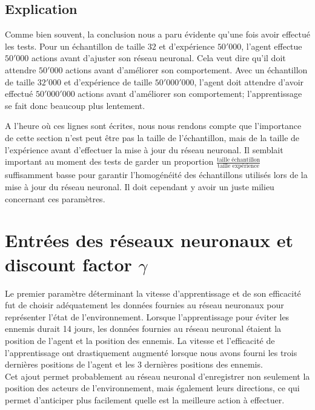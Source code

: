\documentclass[11pt,a4paper]{report}
\begin{document}
   \subsection{Explication}
   
   \par Comme bien souvent, la conclusion nous a paru évidente qu'une fois avoir effectué les tests. Pour un échantillon de taille $32$ et d’expérience $50'000$, l'agent effectue $50'000$ actions avant d'ajuster son réseau neuronal. Cela veut dire qu'il doit attendre $50'000$ actions avant d'améliorer son comportement. Avec un échantillon de taille $32'000$ et d'expérience de taille $50'000'000$, l'agent doit attendre d'avoir effectué $50'000'000$ actions avant d'améliorer son comportement; l'apprentissage se fait donc beaucoup plus lentement. 
   
   \par A l'heure où ces lignes sont écrites, nous nous rendons compte que l'importance de cette section n'est peut être pas la taille de l'échantillon, mais de la taille de l’expérience avant d'effectuer la mise à jour du réseau neuronal. Il semblait important au moment des tests de garder un proportion $\frac{\text{taille échantillon}}{\text{taille expérience}}$ suffisamment basse pour garantir l'homogénéité des échantillons utilisés lors de la mise à jour du réseau neuronal. Il doit cependant y avoir un juste milieu concernant ces paramètres. 
   
   \section{Entrées des réseaux neuronaux et discount factor $\gamma$}
   
   \par Le premier paramètre déterminant la vitesse d'apprentissage et de son efficacité fut de choisir adéquatement les données fournies au réseau neuronaux pour représenter l'état de l'environnement. Lorsque l'apprentissage pour éviter les ennemis durait 14 jours, les données fournies au réseau neuronal étaient la position de l'agent et la position des ennemis. La vitesse et l’efficacité de l'apprentissage ont drastiquement augmenté lorsque nous avons fourni les trois dernières positions de l'agent et les 3 dernières positions des ennemis. \\
   Cet ajout permet probablement au réseau neuronal d'enregistrer non seulement la position des acteurs de l'environnement, mais également leurs directions, ce qui permet d'anticiper plus facilement quelle est la meilleure action à effectuer. 
   
\end{document}
